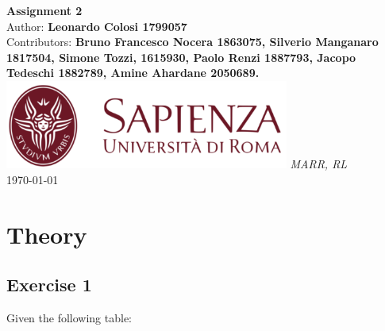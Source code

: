 \documentclass[10pt,a4paper]{article}
\begin{document}
\begin{titlepage}
    \begin{center}
        \vspace*{1cm}
        \Huge\textbf{Assignment 2}\\
        \vspace{1.5cm}
        \Large Author:
        \textbf{Leonardo Colosi 1799057}\\
        \vspace{0.5cm}
        \Large Contributors: \textbf{Bruno Francesco Nocera 1863075, Silverio Manganaro 1817504, Simone Tozzi, 1615930, Paolo Renzi 1887793, Jacopo Tedeschi 1882789, Amine Ahardane 2050689.}
        \vfill
        \includegraphics[width=0.7\textwidth]{images/sapienza_logo.png}
        \vfill
        \vspace{0.8cm}
        \Large \textit{MARR, RL}\\
        \today
    \end{center}
\end{titlepage}
\newpage

\tableofcontents
\newpage

\section{Theory}
\subsection{Exercise 1}
Given the following table:

\newpage
\end{document}
